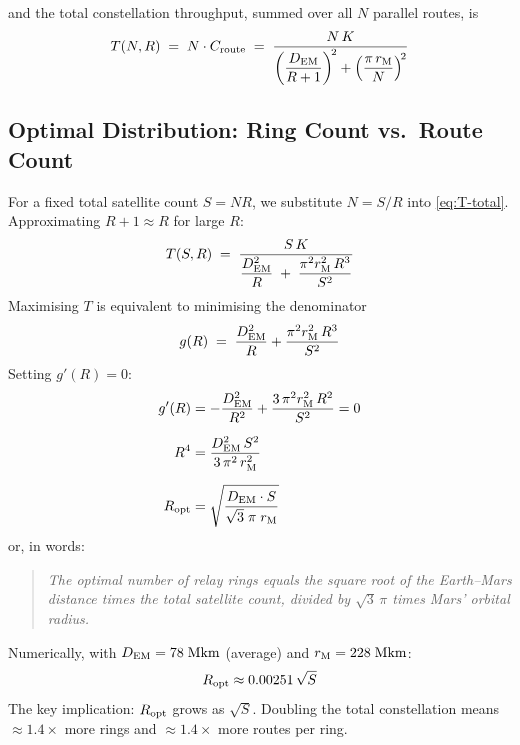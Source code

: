 and the total constellation throughput, summed over all $N$ parallel routes, is
%
\begin{equation}\label{eq:T-total}
  T(N, R) \;=\; N \cdot C_{\text{route}}
  \;=\; \frac{N \, K}{\left(\dfrac{D_{\mathrm{EM}}}{R+1}\right)^{\!2}
  + \left(\dfrac{\pi\,r_{\mathrm{M}}}{N}\right)^{\!2}}
\end{equation}


\subsection{Optimal Distribution: Ring Count vs.\ Route Count}
\label{sec:optimal}


For a fixed total satellite count $S = N R$, we substitute $N = S/R$ into
\cref{eq:T-total}. Approximating $R + 1 \approx R$ for large $R$:
%
\begin{equation}\label{eq:T-of-S-R}
  T(S, R) \;=\; \frac{S \, K}{\dfrac{D_{\mathrm{EM}}^2}{R}
  \;+\; \dfrac{\pi^2 r_{\mathrm{M}}^2 \, R^3}{S^2}}
\end{equation}
%
Maximising $T$ is equivalent to minimising the denominator
%
\begin{equation}
  g(R) \;=\; \frac{D_{\mathrm{EM}}^2}{R} + \frac{\pi^2 r_{\mathrm{M}}^2 \, R^3}{S^2}
\end{equation}
%
Setting $g'(R) = 0$:
%
\begin{align}
  g'(R) &= -\frac{D_{\mathrm{EM}}^2}{R^2} + \frac{3\,\pi^2 r_{\mathrm{M}}^2 \, R^2}{S^2} = 0
  \notag \\[6pt]
  R^4 &= \frac{D_{\mathrm{EM}}^2 \, S^2}{3\,\pi^2\,r_{\mathrm{M}}^2}
  \notag \\[6pt]
  R_{\mathrm{opt}} &= \sqrt{\frac{D_{\mathrm{EM}} \cdot S}{\sqrt{3}\;\pi\;r_{\mathrm{M}}}}
  \label{eq:R-opt}
\end{align}
%
or, in words:
%
\begin{quote}
\emph{The optimal number of relay rings equals the square root of the
Earth--Mars distance times the total satellite count, divided by
$\sqrt{3}\,\pi$ times Mars' orbital radius.}
\end{quote}
%
Numerically, with $D_{\mathrm{EM}} = 78\;\text{Mkm}$ (average) and $r_{\mathrm{M}} = 228\;\text{Mkm}$:
%
\begin{equation}
  R_{\mathrm{opt}} \approx 0.00251 \,\sqrt{S}
\end{equation}
%
The key implication: $R_{\mathrm{opt}}$ grows as $\sqrt{S}$. Doubling the total constellation
means $\approx 1.4\times$ more rings and $\approx 1.4\times$ more routes per ring.


